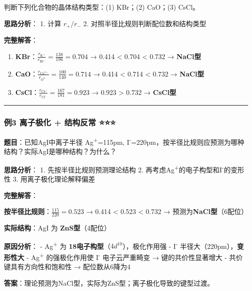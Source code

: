 \documentclass[a4paper,11pt]{ctexart}
\begin{document}
判断下列化合物的晶体结构类型：(1) KBr；(2) CaO；(3) CsCl。

\textbf{思路分析}：
1. 计算 \(r_+/r_-\)
2. 对照半径比规则判断配位数和结构类型

\textbf{完整解答}：

\begin{enumerate}
\def\labelenumi{(\arabic{enumi})}
\item
  \textbf{KBr}：\(\frac{r_{\mathrm{K^+}}}{r_{\mathrm{Br^-}}} = \frac{138}{196} = 0.704\) → 0.414 \textless{} 0.704 \textless{} 0.732 → \textbf{NaCl型}
\item
  \textbf{CaO}：\(\frac{r_{\mathrm{Ca^{2+}}}}{r_{\mathrm{O^{2-}}}} = \frac{100}{140} = 0.714\) → 0.414 \textless{} 0.714 \textless{} 0.732 → \textbf{NaCl型}
\item
  \textbf{CsCl}：\(\frac{r_{\mathrm{Cs^+}}}{r_{\mathrm{Cl^-}}} = \frac{167}{181} = 0.923\) → 0.923 \textgreater{} 0.732 → \textbf{CsCl型}
\end{enumerate}

\begin{center}\rule{0.5\linewidth}{0.5pt}\end{center}

\subsubsection{例3 离子极化 + 结构反常 ⭐⭐⭐}\label{ux4f8b3-ux79bbux5b50ux6781ux5316-ux7ed3ux6784ux53cdux5e38}

\textbf{题目}：已知AgI中离子半径 Ag\textsuperscript{+}=115pm, I\textsuperscript{-}=220pm，按半径比规则应预测为哪种结构？实际AgI是哪种结构？为什么？

\textbf{思路分析}：
1. 先按半径比规则预测理论结构
2. 再考虑Ag\textsuperscript{+}的电子构型和I\textsuperscript{-}的变形性
3. 用离子极化理论解释偏差

\textbf{完整解答}：

\textbf{按半径比规则}：\(\frac{115}{220} = 0.523\) → 0.414 \textless{} 0.523 \textless{} 0.732 → 预测为\textbf{NaCl型}（6配位）

\textbf{实际结构}：AgI 为 \textbf{ZnS型}（4配位）

\textbf{原因分析}：
- Ag\textsuperscript{+} 为 \textbf{18电子构型}（\(4d^{10}\)），极化作用强
- I\textsuperscript{-} 半径大（220pm），\textbf{变形性大}
- Ag\textsuperscript{+} 的强极化作用使 I\textsuperscript{-} 电子云严重畸变 → 键的共价性显著增大
- 共价键具有方向性和饱和性 → 配位数从6降为4

\textbf{答案}：理论预测为NaCl型，实际为ZnS型；离子极化导致的键型过渡。
\end{document}
